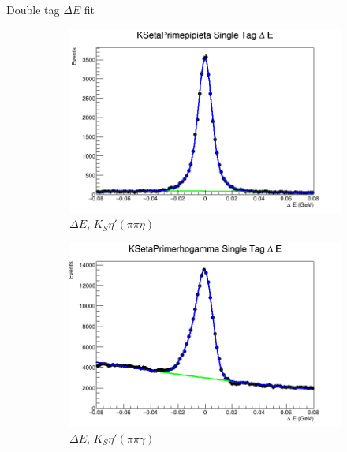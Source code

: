 \documentclass{beamer}
\begin{document}
\begin{frame}{Double tag $\Delta E$ fit}
  \begin{figure}
    \centering
    \begin{subfigure}{0.4\textwidth}
      \centering
      \includegraphics[width=\textwidth]{KSetaPrimepipietaDeltaE.png}
      \caption{$\Delta E$, $K_S\eta'(\pi\pi\eta)$}
    \end{subfigure}%
    \begin{subfigure}{0.4\textwidth}
      \centering
      \includegraphics[width=\textwidth]{KSetaPrimerhogammaDeltaE.png}
      \caption{$\Delta E$, $K_S\eta'(\pi\pi\gamma)$}
    \end{subfigure}
    \begin{subfigure}{0.4\textwidth}
      \centering

\end{subfigure}
\end{figure}
\end{frame}
\end{document}
